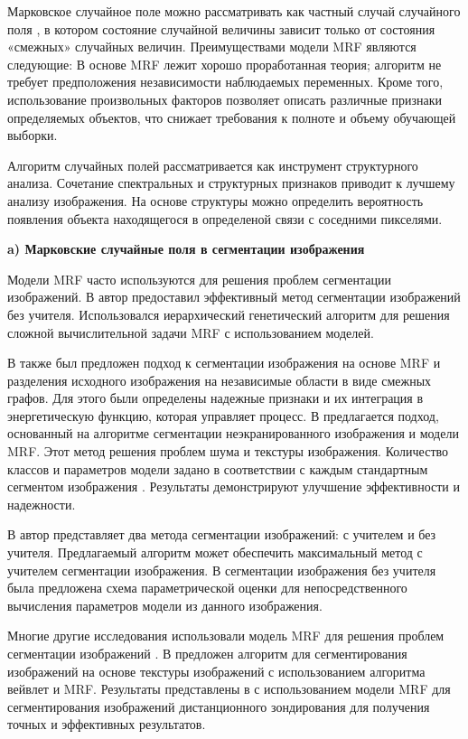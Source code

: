 \documentclass[a4paper,14pt]{extreport}
\begin{document}
Марковское случайное поле можно рассматривать как частный случай случайного поля \cite{h113}, в котором состояние случайной величины зависит только от состояния «смежных» случайных величин. Преимуществами модели MRF являются следующие: В основе MRF лежит хорошо проработанная теория; алгоритм не требует предположения независимости наблюдаемых переменных. Кроме того, использование произвольных факторов позволяет описать различные признаки определяемых объектов, что снижает требования к полноте и объему обучающей выборки.

Алгоритм случайных полей рассматривается как инструмент структурного анализа. Сочетание спектральных и структурных признаков приводит к лучшему анализу изображения. На основе структуры можно определить вероятность появления объекта находящегося в определеной связи с соседними пикселями.

\textbf{a) Марковские случайные поля в сегментации изображения}

Модели MRF часто используются для решения проблем сегментации изображений. В \cite{h114} автор предоставил эффективный метод сегментации изображений без учителя. Использовался иерархический генетический алгоритм для решения сложной вычислительной задачи MRF с использованием моделей. 

В \cite{h115} также был предложен подход к сегментации изображения на основе MRF и разделения исходного изображения на независимые области в виде смежных графов. Для этого были определены надежные признаки и их интеграция в энергетическую функцию, которая управляет процесс. В \cite{h116} предлагается подход, основанный на алгоритме сегментации неэкранированного изображения и модели MRF. Этот метод решения проблем шума и текстуры изображения. Количество классов и параметров модели задано в соответствии с каждым стандартным сегментом изображения \cite{h117}. Результаты демонстрируют улучшение эффективности и надежности.

В \cite{h118} автор представляет два метода сегментации изображений: с учителем и без учителя. Предлагаемый алгоритм может обеспечить максимальный метод с учителем сегментации изображения. В сегментации изображения без учителя была предложена схема параметрической оценки для непосредственного вычисления параметров модели из данного изображения.

Многие другие исследования использовали модель MRF для решения проблем сегментации изображений \cite{h119}. В \cite{h120} предложен алгоритм для сегментирования изображений на основе текстуры изображений с использованием алгоритма вейвлет и MRF. Результаты представлены в \cite{h121, h122} с использованием модели MRF для сегментирования изображений дистанционного зондирования для получения точных и эффективных результатов.
\end{document}
